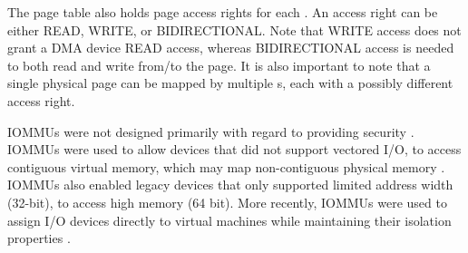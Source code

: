 The page table also holds page access rights for each \iova. An access right can be either READ, WRITE, or BIDIRECTIONAL. Note that WRITE access does not grant a DMA device READ access, whereas BIDIRECTIONAL access is needed to both read and write from/to the page. It is also important to note that a single physical page can be mapped by multiple \iova{}s, each with a possibly different access right.

IOMMUs were not designed primarily with regard to providing security \cite{DWT79}. IOMMUs were used to allow devices that did not support vectored I/O, to access contiguous virtual memory, which may map non-contiguous physical memory \cite{Chu96, WMM97}. IOMMUs also enabled legacy devices that only supported limited address width (32-bit), to access high memory (64 bit). More recently, IOMMUs were used to assign I/O devices directly to virtual machines while maintaining their isolation properties \cite{Int16b, AMD16}. 



